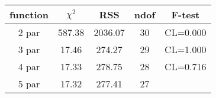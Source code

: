 \begin{tabular}{c|c|c|c|c}
function & $\chi^2$ & RSS & ndof & F-test \\
\hline
2 par & 587.38 & 2036.07 & 30 & CL=0.000 \\
3 par & 17.46 & 274.27 & 29 & CL=1.000 \\
4 par & 17.33 & 278.75 & 28 & CL=0.716 \\
5 par & 17.32 & 277.41 & 27 & \\
\hline
\end{tabular}